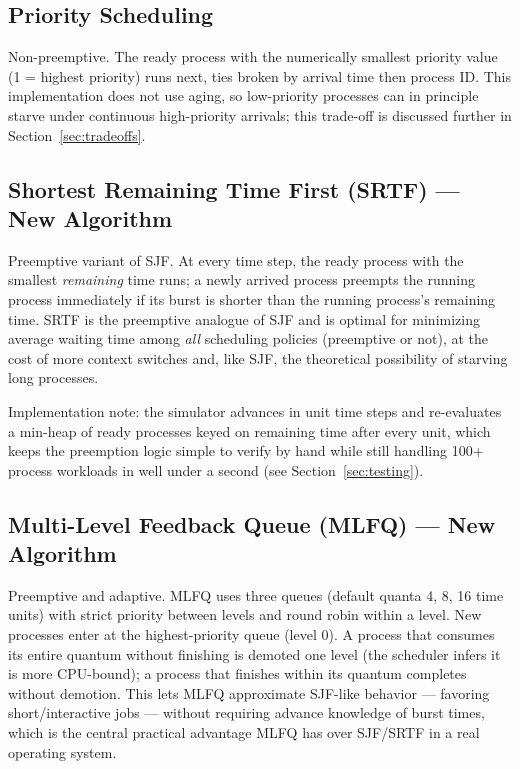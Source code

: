 \documentclass[11pt]{article}
\begin{document}
\subsection{Priority Scheduling}
Non-preemptive. The ready process with the numerically smallest priority
value (1 = highest priority) runs next, ties broken by arrival time then
process ID. This implementation does not use aging, so low-priority
processes can in principle starve under continuous high-priority arrivals;
this trade-off is discussed further in Section~\ref{sec:tradeoffs}.

\subsection{Shortest Remaining Time First (SRTF) --- New Algorithm}
Preemptive variant of SJF. At every time step, the ready process with the
smallest \emph{remaining} time runs; a newly arrived process preempts the
running process immediately if its burst is shorter than the running
process's remaining time. SRTF is the preemptive analogue of SJF and is
optimal for minimizing average waiting time among \emph{all} scheduling
policies (preemptive or not), at the cost of more context switches and,
like SJF, the theoretical possibility of starving long processes.

Implementation note: the simulator advances in unit time steps and
re-evaluates a min-heap of ready processes keyed on remaining time after
every unit, which keeps the preemption logic simple to verify by hand
while still handling 100+ process workloads in well under a second (see
Section~\ref{sec:testing}).

\subsection{Multi-Level Feedback Queue (MLFQ) --- New Algorithm}
Preemptive and adaptive. MLFQ uses three queues (default quanta 4, 8, 16
time units) with strict priority between levels and round robin within a
level. New processes enter at the highest-priority queue (level 0). A
process that consumes its entire quantum without finishing is demoted one
level (the scheduler infers it is more CPU-bound); a process that finishes
within its quantum completes without demotion. This lets MLFQ approximate
SJF-like behavior --- favoring short/interactive jobs --- without requiring
advance knowledge of burst times, which is the central practical advantage
MLFQ has over SJF/SRTF in a real operating system.
\end{document}
